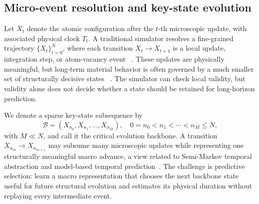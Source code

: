 \documentclass{article}
\begin{document}
\subsection{Micro-event resolution and key-state evolution}



Let \(X_t\) denote the atomic configuration after the \(t\)-th microscopic
update, with associated physical clock \(T_t\). A traditional simulator resolves
a fine-grained trajectory \(\{X_t\}_{t=0}^{N}\), where each transition
\(X_t\to X_{t+1}\) is a local update, integration step, or atom-vacancy event
~\cite{verlet1967fluids,plimpton1995fast,thompson2022lammps,bortz1975nfold,gillespie1977exact}.
These updates are physically meaningful, but long-term material behavior is
often governed by a much smaller set of structurally decisive states
~\cite{voter2002timescale,henkelman2000neb,laio2002metadynamics,bolhuis2002tps,soisson1996cufe,soisson2007cufe}.
The simulator can check local validity, but validity alone does not decide
whether a state should be retained for long-horizon prediction.

We denote a sparse key-state subsequence by
\begin{equation}
\mathcal{B}=(X_{n_0},X_{n_1},\ldots,X_{n_M}), \quad 0=n_0<n_1<\cdots<n_M\leq N,
\end{equation}
with $M\ll N$, and call it the critical evolution backbone. A transition $X_{n_m}\rightarrow X_{n_{m+1}}$ may subsume many microscopic updates while representing one structurally meaningful macro advance, a view related to Semi-Markov temporal abstraction and model-based temporal prediction~\cite{sutton1988td,sutton1990dyna,sutton1999options}. The challenge is predictive selection: learn a macro representation that chooses the next backbone state useful for future structural evolution and estimates its physical duration without replaying every intermediate event.
\end{document}
